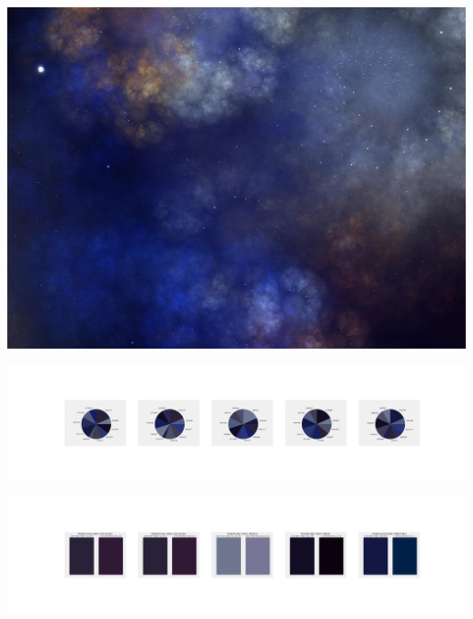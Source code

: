 \documentclass[11pt]{article}
\begin{document}
\begin{landscape}
    \begin{center}
    \includegraphics[width=\textwidth]{./nbimg/file (105).jpg}
    \end{center}

    \begin{center}
    \includegraphics[width=250mm]{./nbimg/pie-7.jpg}
    \end{center}

    \begin{center}
    \includegraphics[width=250mm]{./nbimg/peak-7.jpg}
    \end{center}
    


\end{landscape}
\end{document}
